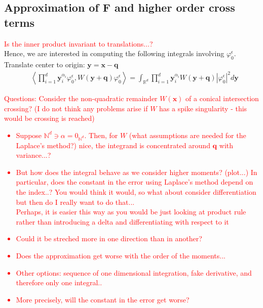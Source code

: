 \subsection{Approximation of F and higher order cross terms}
\textcolor{red}{Is the inner product invariant to translations...?}
\\
Hence, we are interested in computing the following integrals 
involving $\varphi_0^\epsilon$. Translate center to origin: 
$\bm{y} = \bm{x} - \bm{q}$ 
\begin{equation}
  \begin{split}
    &\left \langle
      \prod_{i = 1}^d \bm{y}^{\alpha_i}_{i} \varphi^\epsilon_{0},
      W(\bm{y} + \bm{q}) \varphi^\epsilon_{0}
  \right \rangle
  = \int_{\mathbb{R}^d}
  \prod_{i = 1}^d \bm{y}^{\alpha_i}_{i} 
  W(\bm{y + q}) |\varphi^\epsilon_0|^2 d \bm{y}
\end{split}
\end{equation}
\textcolor{red}{Questions: Consider the non-quadratic remainder $W(\bm{x})$
of a conical intersection crossing? (I do not think any problems arise if $W$ 
has a spike singularity - this would be crossing is reached)
\begin{itemize}
  \item Suppose $\mathbb{N}^d \ni \alpha = 0_{\mathbb{N}^d}$. Then, for 
    $W$ (what assumptions are needed for the Laplace's method?) nice, the 
    integrand is concentrated around $\bm{q}$ with variance...? 
  \item But how does the integral behave as we consider higher moments? (plot...)
        In particular, does the constant in the error using Laplace's method depend 
        on the index..? You would think it would, so what about 
        consider differentiation but then do I really want to do that...
        \\
        Perhaps, it is easier this way as you would be just looking at product rule 
        rather than introducing a delta and differentiating with respect to it
  \item Could it be streched more in one direction than in another?
  \item Does the approximation get worse with the order of the moments...
  \item Other options: sequence of one dimensional integration, fake 
    derivative, and therefore only one integral..
  \item More precisely, will the constant in the error get worse?
\end{itemize}}
\begin{figure}[h!]
  
\end{figure}
